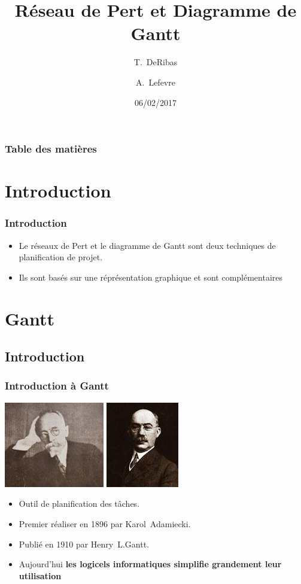 \documentclass{beamer}
\title{Réseau de Pert et Diagramme de Gantt}
\author {T.~DeRibas \and A.~Lefevre}
\institute{UM2}
\date{06/02/2017}
\begin{document}
\begin{frame}
  \frametitle{Table des matières}
  { \tableofcontents}
\end{frame}


\section{Introduction}

\begin{frame}
  \frametitle{Introduction}
  \begin{itemize}
  \item Le réseaux de Pert et le diagramme de Gantt sont deux techniques de planification de projet.
  \item Ils sont basés sur une réprésentation graphique et sont complémentaires
  \end{itemize}
\end{frame}


\section{Gantt}

\subsection{Introduction}

\begin{frame}
  \frametitle{Introduction à Gantt}
  \includegraphics{karol}
  \includegraphics{gant}
 
   
   
  \begin{itemize}
   
  \item Outil de planification des tâches.
  \item Premier réaliser en  1896 par \alert{Karol~Adamiecki}.
  \item Publié en 1910 par \alert{Henry~L.Gantt}.
  \item Aujourd'hui \textbf{les logicels informatiques simplifie grandement leur utilisation}
  \end{itemize}
\end{frame}
\end{document}

